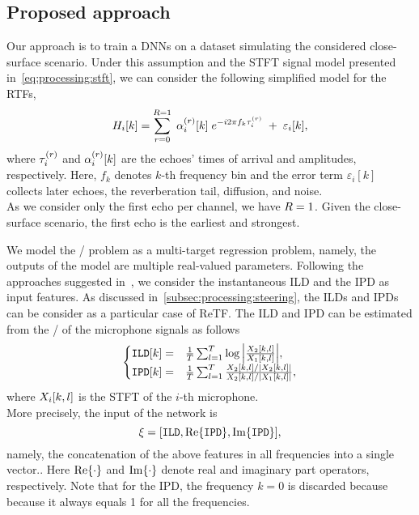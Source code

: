 \subsection{Proposed approach}\label{subsec:lantern:simple:mpl}
Our approach is to train a \acp{DNN} on a dataset simulating the considered close-surface scenario.
Under this assumption and the \acf{STFT} signal model presented in~\cref{eq:processing:stft}, we can consider the following simplified model for the \acfp{RTF},
\begin{equation}\label{eq:mirage:rir}
    H_{i}[k] = \sum_{r=0}^{R=1}  \; \alpha_{i}^{(r)}[k] \; {e}^{- {i} 2 \pi f_k \tau_{i}^{(r)}} \; + \; \varepsilon_{i}[k],
\end{equation}
where $\tau_{i}^{(r)}$ and $\alpha_{i}^{(r)}[k]$ are the echoes' times of arrival and amplitudes, respectively.
Here, $f_k$ denotes $k$-th frequency bin and the error term $\varepsilon_i[k]$ collects later echoes, the reverberation tail, diffusion, and noise.
\\As we consider only the first echo per channel, we have $R=1$.
Given the close-surface scenario, the first echo is the earliest and strongest.

\mynewline
We model the \AER/ problem as a multi-target regression problem, namely, the outputs of the model are multiple real-valued parameters.
Following the approaches suggested in~, we consider the instantaneous \acf{ILD} and the \ac{IPD} as input features.
As discussed in~\cref{subsec:processing:steering}, the \acfp{ILD} and \acfp{IPD} can be consider as a particular case of \acf{ReTF}.
The \ac{ILD} and \ac{IPD} can be estimated from the \STFT/ of the microphone signals as follows
\begin{equation} \label{eq:mirage:features}
\begin{cases}
    \ild[k]  =& \tfrac{1}{T} \sum_{l=1}^T \log{\abs{\frac{\MIC_2[k,l]}{\MIC_1[k,l]}}}, \\
    \ipd[k]  =& \tfrac{1}{T} \sum_{l=1}^T \frac{\MIC_2[k,l]/ \abs{\MIC_2[k,l]}}{ \MIC_2[k,l] / \abs{\MIC_1[k,l]}},\\
\end{cases}
\end{equation}
where $X_i[k,l]$ is the \ac{STFT} of the $i$-th microphone.
\\More precisely, the input of the network is
\begin{equation*}
    \xi = \klist{ \ild, \kRe\set{\ipd}, \kIm\set{\ipd}}
    ,
\end{equation*}
namely, the concatenation of the above features in all frequencies into a single vector..
Here $\kRe\set{\cdot}$ and $\kIm\set{\cdot}$ denote real and imaginary part operators, respectively.
Note that for the \ac{IPD}, the frequency $k=0$ is discarded because because it always equals 1 for all the frequencies.

